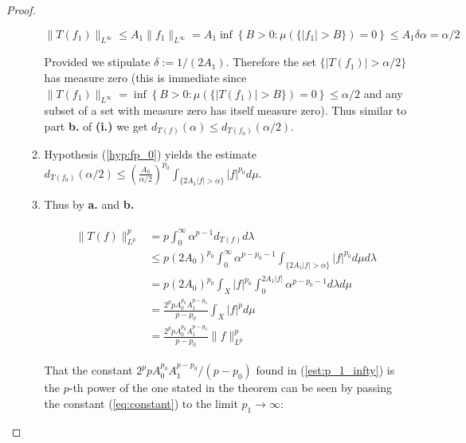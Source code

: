 \begin{proof}
\begin{enumerate}[label = \textbf{(\roman*.)}]
\begin{enumerate}[label = \textbf{\alph*.}]
\begin{equation*}
	\|T(f_1)\|_{L^\infty} \leqslant A_1 \|f_1\|_{L^\infty} = A_1 \inf \left\{B > 0: \mu(\{\vert f_1 \vert > B\}) = 0 \right\} \leqslant A_1\delta\alpha = \alpha/2
\end{equation*}

Provided we stipulate $\delta := 1/(2A_1)$. Therefore the set $\{\vert T(f_1) \vert > \alpha/2\}$ has measure zero (this is immediate since $\|T(f_1)\|_{L^\infty} =  \inf \left\{B > 0: \mu(\{\vert T(f_1) \vert > B\}) = 0 \right\} \leqslant \alpha/2 $ and any subset of a set with measure zero has itself measure zero). Thus similar to part \textbf{b.} of \textbf{(i.)} we get $d_{T(f)}(\alpha) \leqslant d_{T(f_0)}(\alpha/2)$.

	\item Hypothesis (\ref{hyp:fp_0}) yields the estimate $\displaystyle d_{T(f_0)}(\alpha/2) \leqslant \left(\frac{A_0}{\alpha/2}\right)^{p_0} \int_{\{2A_1\vert f \vert > \alpha\}} \vert f \vert^{p_0}d\mu$.

	\item Thus by \textbf{a.} and \textbf{b.}

	\begin{gather}
		\begin{aligned}
			\|T(f)\|_{L^p}^p &= p \int_0^{\infty} \alpha^{p-1}d_{T(f)} d\lambda\\
			&\leqslant p (2A_0)^{p_0} \int_0^{\infty} \alpha^{p-p_0-1} \int_{\{2A_1\vert f \vert > \alpha\}} \vert f \vert^{p_0}d\mu d\lambda\\
			&= p(2A_0)^{p_0} \int_X \vert f\vert^{p_0} \int_0^{2A_1\vert f \vert} \alpha^{p - p_0 - 1}d\lambda d\mu\\
			&= \frac{2^ppA_0^{p_0}A_1^{p - p_0}}{p - p_0} \int_X \vert f\vert^{p} d\mu\\
			&= \frac{2^ppA_0^{p_0}A_1^{p - p_0}}{p - p_0} \|f\|_{L^p}^p
			\label{est:p_1_infty}
		\end{aligned}
	\end{gather}

	That the constant $2^ppA_0^{p_0}A_1^{p - p_0}/(p - p_0)$ found in (\ref{est:p_1_infty}) is the $p$-th power of the one stated in the theorem can be seen by passing the constant (\ref{eq:constant}) to the limit $p_1 \rightarrow \infty$:


\end{enumerate}
\end{enumerate}
\end{proof}

